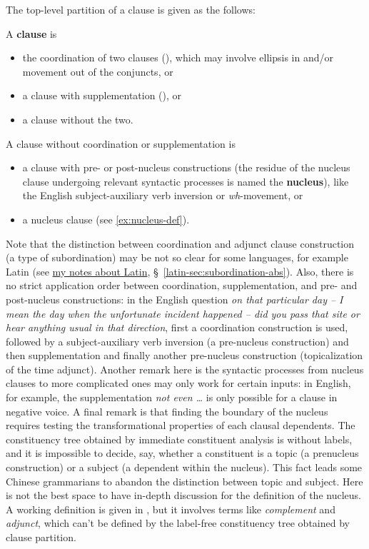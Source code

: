 \documentclass[UTF8, a4paper, oneside, scheme=plain]{ctexart}
\newcommand*{\citesec}[1]{\S~{#1}}
\newcommand*{\concept}[1]{\textbf{#1}}
\newcommand*{\term}[1]{\emph{#1}}
\newcommand*{\corpus}[1]{\emph{#1}}
\newcommand{\latin}{\href{../Latin/latin-notes.pdf}{my notes about Latin}}
\begin{document}
The top-level partition of a clause is given as the follows:
\begin{exe}
    \ex\label{ex:clause-def-1} A \concept{clause} is
    \begin{itemize}
        \item the coordination of two clauses (),
        which may involve ellipsis in and/or movement out of the conjuncts, or
        \item a clause with supplementation (), or
        \item a clause without the two.
    \end{itemize}
    \ex\label{ex:clause-def-2} A clause without coordination or supplementation is 
    \begin{itemize}
        \item a clause with pre- or post-nucleus constructions
        (the residue of the nucleus clause undergoing relevant syntactic processes 
        is named the \concept{nucleus}), 
        like the English subject-auxiliary verb inversion or \term{wh}-movement, or 
        \item a nucleus clause (see \eqref{ex:nucleus-def}).
    \end{itemize}
\end{exe}
Note that the distinction between 
coordination and adjunct clause construction (a type of subordination)
may be not so clear for some languages, 
for example Latin (see \latin, \citesec{\ref{latin-sec:subordination-abs}}).
Also, there is no strict application order 
between coordination, supplementation, and pre- and post-nucleus constructions:
in the English question
\corpus{on that particular day -- I mean the day when the unfortunate incident happened -- 
did you pass that site or hear anything usual in that direction},
first a coordination construction is used, 
followed by a subject-auxiliary verb inversion (a pre-nucleus construction)
and then supplementation 
and finally another pre-nucleus construction (topicalization of the time adjunct).
Another remark here is the syntactic processes from nucleus clauses to more complicated ones 
may only work for certain inputs:
in English, for example, the supplementation \corpus{not even \dots} 
is only possible for a clause in negative voice.
A final remark is that finding the boundary of the nucleus 
requires testing the transformational properties of each clausal dependents.
The constituency tree obtained by immediate constituent analysis 
is without labels,
and it is impossible to decide, say, whether a constituent is a topic (a prenucleus construction)
or a subject (a dependent within the nucleus).
This fact leads some Chinese grammarians to abandon the distinction between topic and subject. %
Here is not the best space to have in-depth discussion for the definition of the nucleus.
A working definition is given in ,
but it involves terms like \term{complement} and \term{adjunct},
which can't be defined by the label-free constituency tree obtained by clause partition.
\end{document}
